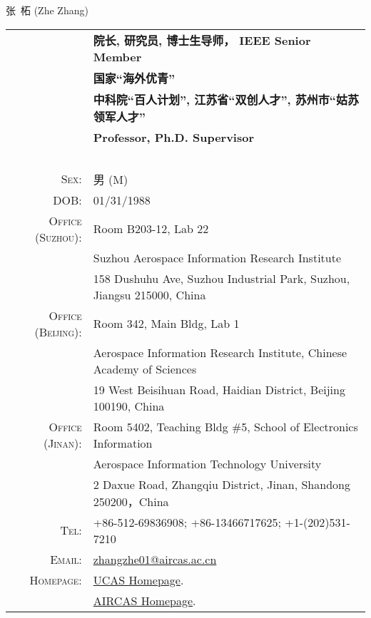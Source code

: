 \documentclass[paper=a4,fontsize=11pt]{scrartcl}
\newcommand{\sepspace}{\vspace*{1em}}		%
\newcommand{\MyName}[1]{
		\Huge \usefont{OT1}{phv}{b}{n} \hfill #1 		%
		\par \normalsize \normalfont}
\newcommand{\MySlogan}[1]{
		\large \usefont{OT1}{phv}{m}{n}\hfill \textit{#1} %
		\par \normalsize \normalfont}
\begin{document}

\MyName{张~柘 (Zhe Zhang)}

\sepspace


\begin{tabular}{rl}
	& \textbf{院长, 研究员, 博士生导师， IEEE Senior Member} \\
	& \textbf{国家``海外优青''} \\
	& \textbf{中科院``百人计划'', 江苏省``双创人才'', 苏州市``姑苏领军人才''} \\
	& \textbf{Professor, Ph.D. Supervisor} \\
	~&~\\
\textsc{Sex:} & 男 (M) \\
\textsc{DOB:} & 01/31/1988 \\
\textsc{Office (Suzhou):} &  Room B203-12, Lab 22 \\
	& Suzhou Aerospace Information Research Institute \\
	& 158 Dushuhu Ave, Suzhou Industrial Park, Suzhou, Jiangsu 215000, China \\
\textsc{Office (Beijing):}	&  Room 342, Main Bldg, Lab 1 \\
	& Aerospace Information Research Institute, Chinese Academy of Sciences \\
	& 19 West Beisihuan Road, Haidian District, Beijing 100190, China \\
\textsc{Office (Jinan):}	&  Room 5402, Teaching Bldg \#5, School of Electronics Information \\
	& Aerospace Information Technology University \\
	& 2 Daxue Road, Zhangqiu District, Jinan, Shandong 250200，China \\
\textsc{Tel:} & +86-512-69836908; +86-13466717625; +1-(202)531-7210\\
\textsc{Email:} & \href{mailto:zhangzhe01@aircas.ac.cn}{zhangzhe01@aircas.ac.cn} \\
\textsc{Homepage:} & \href{https://people.ucas.ac.cn/~zhe}{UCAS Homepage}. \\
	& \href{http://www.aircas.ac.cn/sourcedb/cn/expert/yjy/202308/t20230803_6853650.html}{AIRCAS Homepage}.
\end{tabular}
\end{document}
